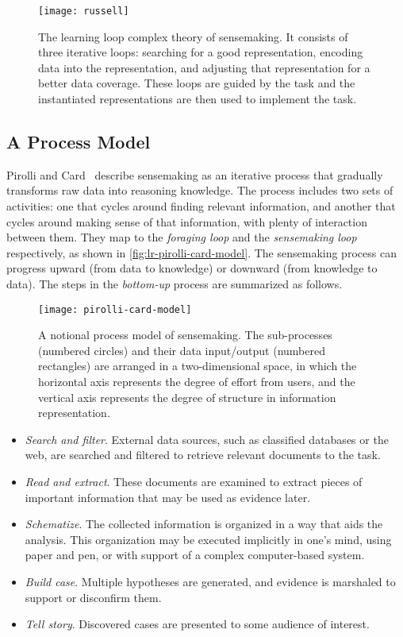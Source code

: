 \begin{figure}
	\centering
	\texttt{[image: russell]}
	\caption[The learning loop complex theory of sensemaking]{The learning loop complex theory of sensemaking. It consists of three iterative loops: searching for a good representation, encoding data into the representation, and adjusting that representation for a better data coverage. These loops are guided by the task and the instantiated representations are then used to implement the task. }
	\label{fig:lr-russell}
\end{figure}

\subsection{A Process Model}
\label{sub:lr-pcm}
Pirolli and Card~\cite{Pirolli2005} describe sensemaking as an iterative process that gradually transforms raw data into reasoning knowledge. The process includes two sets of activities: one that cycles around finding relevant information, and another that cycles around making sense of that information, with plenty of interaction between them. They map to the \emph{foraging loop} and the \emph{sensemaking loop} respectively, as shown in \autoref{fig:lr-pirolli-card-model}. The sensemaking process can progress upward (from data to knowledge) or downward (from knowledge to data). The steps in the \emph{bottom-up} process are summarized as follows.

\begin{figure}
	\centering
	\texttt{[image: pirolli-card-model]}
	\caption[The Pirolli and Card's model of sensemaking]{A notional process model of sensemaking. The sub-processes (numbered circles) and their data input/output (numbered rectangles) are arranged in a two-dimensional space, in which the horizontal axis represents the degree of effort from users, and the vertical axis represents the degree of structure in information representation. }
	\label{fig:lr-pirolli-card-model}
\end{figure}

\begin{itemize}
	\item \emph{Search and filter}. External data sources, such as classified databases or the web, are searched and filtered to retrieve relevant documents to the task.
	\item \emph{Read and extract}. These documents are examined to extract pieces of important information that may be used as evidence later.
	\item \emph{Schematize}.  The collected information is organized in a way that aids the analysis. This organization may be executed implicitly in one's mind, using paper and pen, or with support of a complex computer-based system.
	\item \emph{Build case}. Multiple hypotheses are generated, and evidence is marshaled to support or disconfirm them.
	\item \emph{Tell story}. Discovered cases are presented to some audience of interest.
\end{itemize}

